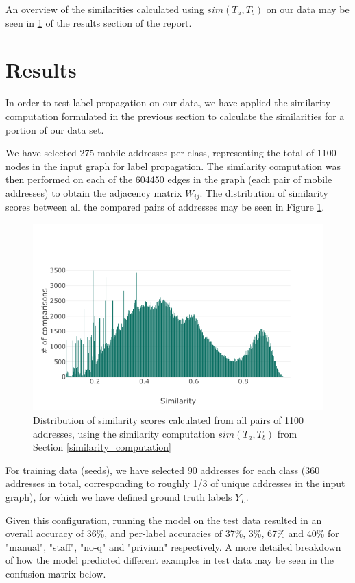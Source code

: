 \par
An overview of the similarities calculated using $sim(T_a,T_b)$ on our data may be seen in \cref{fig:results:similarity_distribution} of the results section of the report.


\section{Results}
In order to test label propagation on our data, we have applied the similarity computation formulated in the previous section to calculate the similarities for a portion of our data set.\par
\medskip
We have selected 275 mobile addresses per class, representing the total of 1100 nodes in the input graph for label propagation. The similarity computation was then performed on each of the 604450 edges in the graph (each pair of mobile addresses) to obtain the adjacency matrix $W_{ij}$. The distribution of similarity scores between all the compared pairs of addresses may be seen in Figure \ref{fig:results:similarity_distribution}. \par

\begin{figure}[H]
    \centering
    \includegraphics[width=.7\textwidth]{Pictures/similarity_distribution_plot.png}
    \caption{Distribution of similarity scores calculated from all pairs of 1100 addresses, using the similarity computation $sim(T_a,T_b)$ from Section \ref{similarity_computation}}
    \label{fig:results:similarity_distribution}
\end{figure}

\medskip
For training data (seeds), we have selected 90 addresses for each class (360 addresses in total, corresponding to roughly 1/3 of unique addresses in the input graph), for which we have defined ground truth labels $Y_L$.\par
\medskip

Given this configuration, running the model on the test data resulted in an overall accuracy of 36\%, and per-label accuracies of 37\%, 3\%, 67\% and 40\% for "manual", "staff", "no-q" and "privium" respectively. A more detailed breakdown of how the model predicted different examples in test data may be seen in the confusion matrix below.

